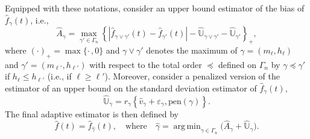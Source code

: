 \documentclass[bj,authoryear]{imsart}
\numberwithin{equation}{section}
\theoremstyle{plain}
\theoremstyle{remark}
\newcommand{\1}{\mathds{1}}
\begin{document}
    Equipped with these notations, consider an upper bound estimator of the bias of $\hat{f}_{\gamma}(t)$, i.e.,
    \begin{equation}\label{eq:hat.A.gamma}
        \hat{A}_{\gamma} = \max_{\gamma'\in \Gamma_{\!n}} \left\{\left|\hat{f}_{\gamma\vee\gamma'}(t) - \hat{f}_{\gamma'}(t)\right| - \hat{\mathbb{U}}_{\gamma\vee\gamma'} - \hat{\mathbb{U}}_{\gamma'}\right\}_+,
    \end{equation}
    where $(\cdot)_+ = \max\{\cdot \, ,0\}$ and $\gamma\vee\gamma'$ denotes the maximum of $\gamma=(m_{\ell},h_{\ell})$ and $\gamma'=(m_{\ell'},h_{\ell'})$ with respect to the total order $\preceq$ defined on $\Gamma_{\!n}$ by $\gamma\preceq\gamma'$ if $h_{\ell} \leq h_{\ell'}$ (i.e., if $\ell\geq \ell'$).
    Moreover, consider a penalized version of the estimator of an upper bound on the standard deviation estimator of $\hat{f}_{\gamma}(t)$,
    \begin{equation}\label{eq:hat.U.gamma}
        \hat{\mathbb{U}}_{\gamma} = r_{\gamma}\left\{\hat{v}_{\gamma} +\varepsilon_{\gamma}, \mathrm{pen}(\gamma)\right\}.
    \end{equation}
    The final adaptive estimator is then defined by
    \begin{equation}\label{eq:selection.rule}
        \hat{f}(t) = \hat{f}_{\hat{\gamma}}(t),
        \quad \text{where} \quad
        \hat{\gamma} = \mathop{\mathrm{arg\,min}}_{\gamma\in \Gamma_{\!n}} \big(\hat{A}_{\gamma} + \hat{\mathbb{U}}_{\gamma}\big).
    \end{equation}
\end{document}

